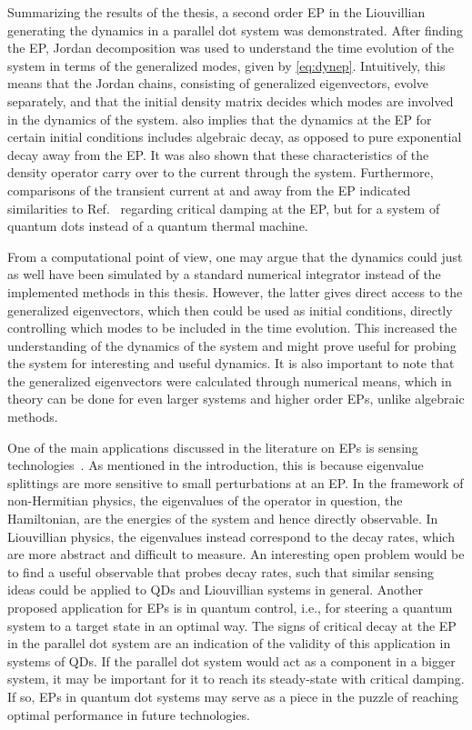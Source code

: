 \documentclass[../main.tex]{subfiles}
\begin{document}
Summarizing the results of the thesis, a second order EP in the Liouvillian generating the dynamics in a parallel dot system was demonstrated. After finding the EP, Jordan decomposition was used to understand the time evolution of the system in terms of the generalized modes, given by \cref{eq:dynep}. Intuitively, this means that the Jordan chains, consisting of generalized eigenvectors, evolve separately, and that the initial density matrix decides which modes are involved in the dynamics of the system.  also implies that the dynamics at the EP for certain initial conditions includes algebraic decay, as opposed to pure exponential decay away from the EP. It was also shown that these characteristics of the density operator carry over to the current through the system. Furthermore, comparisons of the transient current at and away from the EP indicated similarities to Ref.~\cite{thermal} regarding critical damping at the EP, but for a system of quantum dots instead of a quantum thermal machine.

From a computational point of view, one may argue that the dynamics could just as well have been simulated by a standard numerical integrator instead of the implemented methods in this thesis. However, the latter gives direct access to the generalized eigenvectors, which then could be used as initial conditions, directly controlling which modes to be included in the time evolution. This increased the understanding of the dynamics of the system and might prove useful for probing the system for interesting and useful dynamics. It is also important to note that the generalized eigenvectors were calculated through numerical means, which in theory can be done for even larger systems and higher order EPs, unlike algebraic methods. %

One of the main applications discussed in the literature on EPs is sensing technologies~\cite{microring2,microring1,eptechrev1,eptechrev2}. As mentioned in the introduction, this is because eigenvalue splittings are more sensitive to small perturbations at an EP. In the framework of non-Hermitian physics, the eigenvalues of the operator in question, the Hamiltonian, are the energies of the system and hence directly observable. In Liouvillian physics, the eigenvalues instead correspond to the decay rates, which are more abstract and difficult to measure. An interesting open problem would be to find a useful observable that probes decay rates, such that similar sensing ideas could be applied to QDs and Liouvillian systems in general. Another proposed application for EPs is in quantum control, i.e., for steering a quantum system to a target state in an optimal way. The signs of critical decay at the EP in the parallel dot system are an indication of the validity of this application in systems of QDs. If the parallel dot system would act as a component in a bigger system, it may be important for it to reach its steady-state with critical damping. If so, EPs in quantum dot systems may serve as a piece in the puzzle of reaching optimal performance in future technologies.
\end{document}
